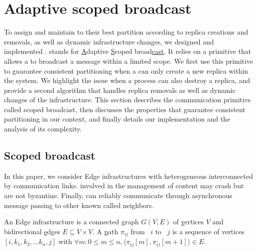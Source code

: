 
\section{Adaptive scoped broadcast}
\label{sec:adaptive}

To assign and maintain \processes to their best partition according to
replica creations and removals, as well as dynamic infrastructure
changes, we designed and implemented \NAME.  \NAME stands for
\underline{A}daptive \underline{S}coped broad\underline{cast}. It
relies on a primitive that allows a \process to broadcast a message
within a limited scope. We first use this primitive to guarantee
consistent partitioning when a \process can only create a new replica
within the system. We highlight the issue when a process can also
destroy a replica, and provide a second algorithm that handles replica
removals as well as dynamic changes of the infrastructure.  This
section describes the communication primitive called scoped broadcast,
then discusses the properties that guarantee consistent partitioning
in our context, and finally details our implementation \NAME and the
analysis of its complexity.


\subsection{Scoped broadcast}
\label{subsec:scoped}

%

In this paper, we consider Edge infrastructures with heterogeneous
\nodes interconnected by communication links. \Processes involved in
the management of content may crash but are not byzantine.  Finally,
\processes can reliably communicate through asynchronous message
passing to other known \processes called neighbors.  %

\begin{definition}
  An Edge infrastructure is a connected \underline{g}raph $G(V, E)$ of
  \underline{v}ertices $V$ and bidirectional \underline{e}dges $E
  \subseteq V \times V$.  A \underline{p}ath $\pi_{ij}$ from
  \Process~$i$ to \Process~$j$ is a sequence of vertices $[i, k_1,
    k_2, \ldots k_n, j]$ with $\forall m: 0\leq m \leq n, \langle
  \pi_{ij}[m], \pi_{ij}[m+1] \rangle \in E$.
\end{definition}


